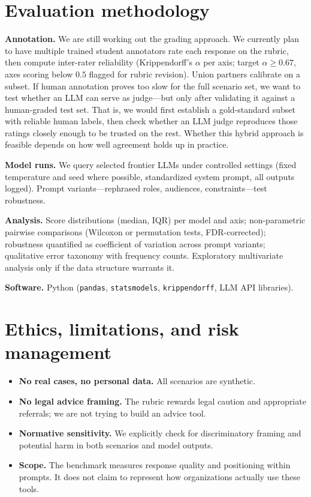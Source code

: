 \documentclass[11pt,a4paper]{article}
\begin{document}
\section{Evaluation methodology}
\textbf{Annotation.} We are still working out the grading approach. We currently plan to have multiple trained student annotators rate each response on the rubric, then compute inter-rater reliability (Krippendorff's $\alpha$ per axis; target $\alpha \geq 0.67$, axes scoring below $0.5$ flagged for rubric revision). Union partners calibrate on a subset. If human annotation proves too slow for the full scenario set, we want to test whether an LLM can serve as judge---but only after validating it against a human-graded test set. That is, we would first establish a gold-standard subset with reliable human labels, then check whether an LLM judge reproduces those ratings closely enough to be trusted on the rest. Whether this hybrid approach is feasible depends on how well agreement holds up in practice.

\textbf{Model runs.} We query selected frontier LLMs under controlled settings (fixed temperature and seed where possible, standardized system prompt, all outputs logged). Prompt variants---rephrased roles, audiences, constraints---test robustness.

\textbf{Analysis.} Score distributions (median, IQR) per model and axis; non-parametric pairwise comparisons (Wilcoxon or permutation tests, FDR-corrected); robustness quantified as coefficient of variation across prompt variants; qualitative error taxonomy with frequency counts. Exploratory multivariate analysis only if the data structure warrants it.

\textbf{Software.} Python (\texttt{pandas}, \texttt{statsmodels}, \texttt{krippendorff}, LLM API libraries).

\section{Ethics, limitations, and risk management}
\begin{itemize}
  \item \textbf{No real cases, no personal data.} All scenarios are synthetic.
  \item \textbf{No legal advice framing.} The rubric rewards legal caution and appropriate referrals; we are not trying to build an advice tool.
  \item \textbf{Normative sensitivity.} We explicitly check for discriminatory framing and potential harm in both scenarios and model outputs.
  \item \textbf{Scope.} The benchmark measures response quality and positioning within prompts. It does not claim to represent how organizations actually use these tools.
\end{itemize}
\end{document}
